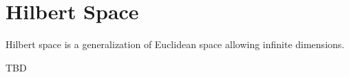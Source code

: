 \section{Hilbert Space}

Hilbert space is a generalization of Euclidean space
allowing infinite dimensions.

\begin{definition}
TBD
\end{definition}



